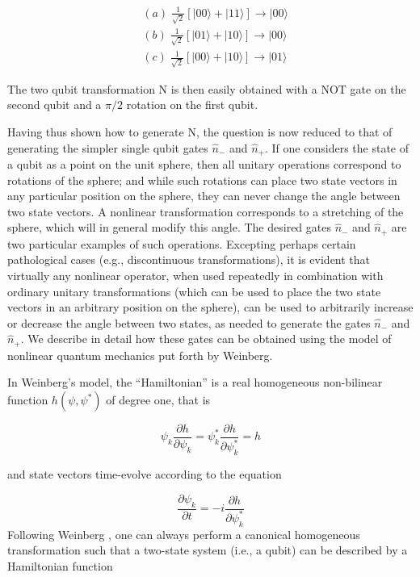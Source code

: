 \documentclass{article}
\begin{document}
\begin{align}
&  (a)\;\frac{1}{\sqrt{2}}\left[  |00\rangle+|11\rangle\right]
\longrightarrow|00\rangle\nonumber\\
&  (b)\;\frac{1}{\sqrt{2}}\left[  |01\rangle+|10\rangle\right]
\longrightarrow|00\rangle\\
&  (c)\;\frac{1}{\sqrt{2}}\left[  |00\rangle+|10\rangle\right]
\longrightarrow|01\rangle\nonumber
\end{align}

The two qubit transformation N is then easily obtained with a NOT gate on the
second qubit and a $\pi/2$ rotation on the first qubit.\ 

Having thus shown how to generate N, the question is now reduced to that of
generating the simpler single qubit gates $\widehat{n}_{-}$ and $\widehat
{n}_{+}$. If one considers the state of a qubit as a point on the unit sphere,
then all unitary operations correspond to rotations of the sphere; and while
such rotations can place two state vectors in any particular position on the
sphere, they can never change the angle between two state vectors. A nonlinear
transformation corresponds to a stretching of the sphere, which will in
general modify this angle. The desired gates $\widehat{n}_{-}$ and
$\widehat{n}_{+}$ are two particular examples of such operations. Excepting
perhaps certain pathological cases (e.g., discontinuous transformations), it
is evident that virtually any nonlinear operator, when used repeatedly in
combination with ordinary unitary transformations (which can be used to place
the two state vectors in an arbitrary position on the sphere), can be used to
arbitrarily increase or decrease the angle between two states, as needed to
generate the gates $\widehat{n}_{-}$ and $\widehat{n}_{+}$. We describe in
detail how these gates can be obtained using the model of nonlinear quantum
mechanics put forth by Weinberg.

In Weinberg's model, the ``Hamiltonian'' is a real homogeneous non-bilinear
function $h(\psi,\psi^{*})$ of degree one, that is\cite{Weinberg 2}%

\begin{equation}
\psi_{k}\frac{\partial h}{\partial\psi_{k}}=\psi_{k}^{*}\frac{\partial
h}{\partial\psi_{k}^{*}}=h
\end{equation}

and state vectors time-evolve according to the equation%

\begin{equation}
\frac{\partial\psi_{k}}{\partial t}=-i\frac{\partial h}{\partial\psi_{k}^{*}}
\label{SE}%
\end{equation}
Following Weinberg \cite{Weinberg 2}, one can always perform a canonical
homogeneous transformation such that a two-state system (i.e., a qubit) can be
described by a Hamiltonian function%
\end{document}
